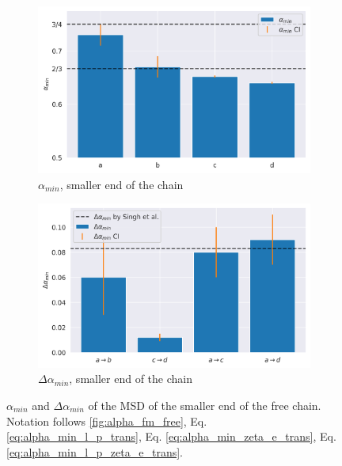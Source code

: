 \documentclass[
    paper=A4,pagesize=automedia,fontsize=12pt,
    BCOR=15mm,DIV=22,
    twoside,headinclude,footinclude=false,
    fleqn,             %
    bibliography=totocnumbered,          %
    listof=totoc,                %
    listof=flat,                 %
    cleardoublepage=empty      %
    numbers=endperiod
]{scrartcl}
\begin{document}
\begin{figure}
    \centering
    \begin{subfigure}[b]{\textwidth}
        \centering
        \includegraphics[width=\textwidth]{17+18+19+20-exp-alpha_min_fm.png}
        \caption{$\alpha_{min}$, smaller end of the chain}
        \label{fig:alpha_min_fm}
    \end{subfigure}
    \begin{subfigure}[b]{\textwidth}
        \centering
        \includegraphics[width=\textwidth]{17+18+19+20-exp-delta_alpha_min_fm.png}
        \caption{$\Delta \alpha_{min}$, smaller end of the chain}
        \label{fig:delta_alpha_min_fm}
    \end{subfigure}
    \caption{
        $\alpha_{min}$ and $\Delta \alpha_{min}$ of the MSD of the smaller end of the free chain.
        Notation follows \autoref{fig:alpha_fm_free}, Eq. \ref{eq:alpha_min_l_p_trans},
        Eq. \ref{eq:alpha_min_zeta_e_trans}, Eq. \ref{eq:alpha_min_l_p_zeta_e_trans}.
    }
    \label{fig:alpha_and_delta_alpha_fm}
\end{figure}
\end{document}
